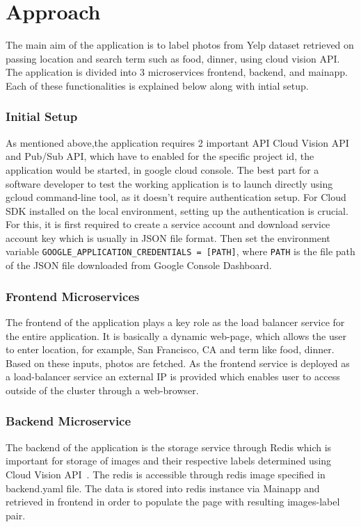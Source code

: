 \section{Approach}

The main aim of the application is to label photos from Yelp dataset
retrieved on passing location and search term such as food, dinner,
using cloud vision API. The application is divided into 3
microservices frontend, backend, and mainapp. Each of these
functionalities is explained below along with intial setup.

\subsubsection{Initial Setup} 

As mentioned above,the application requires 2 important API Cloud
Vision API and Pub/Sub API, which have to enabled for the specific
project id, the application would be started, in google cloud
console. The best part for a software developer to test the working
application is to launch directly using gcloud command-line tool, as
it doesn’t require authentication setup.  For Cloud SDK installed on
the local environment, setting up the authentication is crucial. For
this, it is first required to create a service account and download
service account key which is usually in JSON file format. Then set the
environment variable \verb|GOOGLE_APPLICATION_CREDENTIALS = [PATH]|,
where \verb|PATH| is the file path of the JSON file downloaded from Google
Console Dashboard.

\subsubsection{Frontend Microservices} 

The frontend of the application plays a key role as the load balancer
service for the entire application. It is basically a dynamic
web-page, which allows the user to enter location, for example, San
Francisco, CA and term like food, dinner. Based on these inputs,
photos are fetched. As the frontend service is deployed as a
load-balancer service an external IP is provided which enables user to
access outside of the cluster through a web-browser.

\subsubsection{Backend Microservice} 

The backend of the application is the storage service through Redis
which is important for storage of images and their respective labels
determined using Cloud Vision API~\cite{hid-sp18-602-redis}. The redis
is accessible through redis image specified in backend.yaml file. The
data is stored into redis instance via Mainapp and retrieved in
frontend in order to populate the page with resulting images-label
pair.

